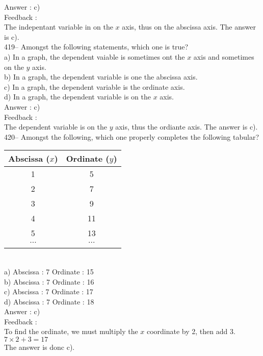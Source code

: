 ﻿\documentclass[letterpaper, 12pt]{article}
\begin{document}
Answer : c)\\

Feedback :\\
The indepentant variable in on the $x$ axis, thus on the abscissa axis. The answer is c).\\

419-- Amongst the following statements, which one is true?\\
a) In a graph, the dependent vaiable is sometimes ont the $x$ axis and sometimes on the $y$ axis.  \\
b) In a graph, the dependent variable is one the abscissa axis.\\
c) In a graph, the dependent variable is the ordinate axis.\\
d) In a graph, the dependent variable is on the $x$ axis.\\

Answer : c)\\

Feedback :\\
The dependent variable is on the $y$ axis, thus the ordiante axis.  The answer is c).\\


420-- Amongst the following, which one properly completes the following tabular?\\
\begin{tabular}{|c|c|} \hline
{\bf Abscissa ($x$)} & {\bf Ordinate ($y$)}  \\ \hline \hline

1 & 5 \\ \hline
2 & 7 \\ \hline
3 & 9 \\ \hline
4 & 11 \\ \hline
5 & 13 \\ \hline
$\ldots$ & $\ldots$ \\ \hline
\multicolumn{2}{c}{}\\
\end{tabular}\\
a) Abscissa : 7 \qquad Ordinate : 15\\
b) Abscissa : 7 \qquad Ordinate : 16\\
c) Abscissa : 7 \qquad Ordinate : 17\\
d) Abscissa : 7 \qquad Ordinate : 18\\

Answer : c)\\

Feedback :\\
To find the ordinate, we must multiply the $x$ coordinate by 2,
then add 3.  \\
$7\times2+3=17$\\
The answer is donc c).\\
\end{document}
